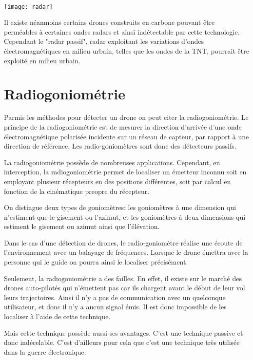 ~\\

\texttt{[image: radar]}

Il existe néanmoins certains drones construits en carbone pouvant être perméables à certaines ondes radars et ainsi indétectable par cette technologie. Cependant le "radar passif", radar exploitant les variations d'ondes électromagnétiques en milieu urbain, telles que les ondes de la TNT, pourrait être exploité en milieu urbain.



\section{Radiogoniométrie}

Parmis les méthodes pour détecter un drone on peut citer la radiogoniométrie. Le principe de la radiogoniométrie est de mesurer la direction d'arrivée d'une onde électromagnétique polarisée incidente sur un réseau de capteur, par rapport à une direction de référence. Les radio-goniomètres sont donc des détecteurs passifs. 

La radiogoniométrie possède de nombreuses applications. Cependant, en interception, la radiogoniométrie permet de localiser un émetteur inconnu soit en employant plusieur récepteurs en des positions différentes, soit par calcul en fonction de la cinématique preopre du récepteur. 

On distingue deux types de goniomètres: les goniomètres à une dimension qui n'estiment que le gisement ou l'azimut, et les goniomètres à deux dimensions qui estiment le gisement ou azimut ainsi que l'élévation. 


Dans le cas d'une détection de drones, le radio-goniomètre réalise une écoute de l'environnement avec un balayage de fréquences. Lorsque le drone émettra avec la personne qui le guide on pourra ainsi le localiser précisément.

Seulement, la radiogoniométrie a des failles. En effet, il existe sur le marché des drones auto-pilotés qui n'émettent pas car ils chargent avant le début de leur vol leurs trajectoires. Ainsi il n'y a pas de communication avec un quelconque utilisateur, et donc il n'y a aucun signal émis. Il est donc impossible de les localiser à l'aide de cette technique.

Mais cette technique possède aussi ses avantages. C'est une technique passive et donc indécelable. C'est d'ailleurs pour cela que c'est une technique très utilisée dans la guerre électronique. 




